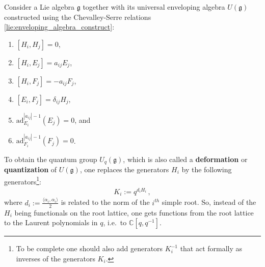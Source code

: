     \begin{construct}
        Consider a Lie algebra $\mathfrak{g}$ together with its universal enveloping algebra $U(\mathfrak{g})$ constructed using the Chevalley-Serre relations \ref{lie:enveloping_algebra_construct}:
        \begin{enumerate}
            \item $[H_i,H_j] = 0$,
            \item $[H_i,E_j] = a_{ij}E_j$,
            \item $[H_i,F_j] = -a_{ij}F_j$,
            \item $[E_i,F_j] = \delta_{ij}H_j$,
            \item $\text{ad}_{E_i}^{|a_{ij}|-1}(E_j) = 0$, and
            \item $\text{ad}_{F_i}^{|a_{ij}|-1}(F_j) = 0$.
        \end{enumerate}
         To obtain the quantum group $U_q(\mathfrak{g})$, which is also called a \textbf{deformation} or \textbf{quantization} of $U(\mathfrak{g})$, one replaces the generators $H_i$ by the following generators\footnote{To be complete one should also add generators $K_i^{-1}$ that act formally as inverses of the generators $K_i$.}:
        \begin{gather}
            K_i := q^{d_iH_i}\,,
        \end{gather}
        where $d_i := \frac{\langle\alpha_i,\alpha_i\rangle}{2}$ is related to the norm of the $i^{th}$ simple root. So, instead of the $H_i$ being functionals on the root lattice, one gets functions from the root lattice to the Laurent polynomials in $q$, i.e.~to $\mathbb{C}[q,q^{-1}]$.


\end{construct}
